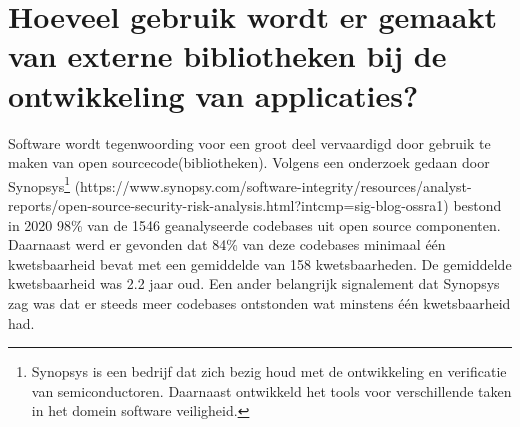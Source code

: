%
%
%

\section{Hoeveel gebruik wordt er gemaakt van externe bibliotheken bij de ontwikkeling van applicaties?}\label{sec:hoeveel-gebruik-wordt-er-gemaakt-van-externe-bibliotheken-bij-de-ontwikkeling-van-applicaties?}
Software wordt tegenwoording voor een groot deel vervaardigd door gebruik te maken van open source\-code(bibliotheken). Volgens een onderzoek gedaan door Synopsys\footnote{Synopsys is een bedrijf dat zich bezig houd met de ontwikkeling en verificatie van semiconductoren. Daarnaast ontwikkeld het tools voor verschillende taken in het domein software veiligheid.} (https://www.synopsy.com/software-integrity/resources/analyst-reports/open-source-security-risk-analysis.html?intcmp=sig-blog-ossra1) bestond in 2020 98\% van de 1546 geanalyseerde codebases uit open source componenten. Daarnaast werd er gevonden dat 84\% van deze codebases minimaal één kwetsbaarheid bevat met een gemiddelde van 158 kwetsbaarheden. De gemiddelde kwetsbaarheid was 2.2 jaar oud. Een ander belangrijk signalement dat Synopsys zag was dat er steeds meer codebases ontstonden wat minstens één kwetsbaarheid had.

